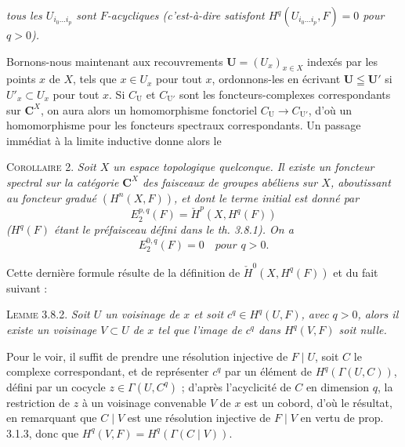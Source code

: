 
\noindent\textit{tous les $U_{i_0\ldots i_p}$ sont $F$-acycliques
\textup{(}c'est-à-dire satisfont $H^q(U_{i_0\ldots i_p},F)=0$ pour $q>0$\textup{)}.}

Bornons-nous maintenant aux recouvrements
$\mathbf U=(U_x)_{x\in X}$ indexés par les points $x$ de $X$, tels que
$x\in U_x$ pour tout $x$, ordonnons-les en écrivant
$\mathbf U\leqq\mathbf U'$ si $U'_x\subset U_x$ pour tout $x$.
Si $C_{\mathrm U}$ et $C_{\mathrm U'}$ sont les foncteurs-complexes
correspondants sur $\mathbf C^X$, on aura alors un homomorphisme fonctoriel
$C_{\mathrm U}\to C_{\mathrm U'}$, d'où un homomorphisme pour
les foncteurs spectraux correspondants. Un passage immédiat à la limite
inductive donne alors le

\textsc{Corollaire 2.} \textit{Soit $X$ un espace topologique
quelconque. Il existe un foncteur spectral sur la catégorie $\mathbf C^X$ des faisceaux
de groupes abéliens sur $X$, aboutissant au foncteur gradué $(H^n(X,F))$, et
dont le terme initial est donné par}
\[
E_2^{p,q}(F)=\check H^p(X,H^q(F))
\]
\textit{\textup{(}$H^q(F)$ étant le préfaisceau défini dans le th. \textup{3.8.1)}. On a}
\[
E_2^{0,q}(F)=0\quad\textit{pour }q>0.
\]

Cette dernière formule résulte de la définition de
$\check H^0(X,H^q(F))$ et du fait suivant :

\textsc{Lemme 3.8.2.} \textit{Soit $U$ un voisinage de $x$ et
soit $c^q\in H^q(U,F)$, avec $q>0$, alors il existe un voisinage $V\subset U$ de $x$ tel
que l'image de $c^q$ dans $H^q(V,F)$ soit nulle.}

Pour le voir, il suffit de prendre une résolution injective de $F\mid U$, soit
$C$ le complexe correspondant, et de représenter $c^q$ par un élément de
$H^q(\Gamma(U,C))$, défini par un cocycle $z\in\Gamma(U,C^q)$ ; d'après
l'acyclicité de $C$ en dimension $q$, la restriction de $z$ à un voisinage
convenable $V$ de $x$ est un cobord, d'où le résultat, en remarquant que
$C\mid V$ est une résolution injective de $F\mid V$ en vertu de prop. 3.1.3,
donc que $H^q(V,F)=H^q(\Gamma(C\mid V))$.

